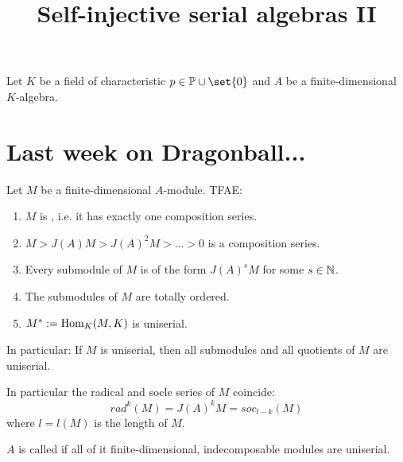 \documentclass[fontsize=11pt,fleqn,a4paper]{scrartcl}
\title{Self-injective serial algebras II}
\begin{document}
\maketitle

\begin{convention}
Let $K$ be a field of characteristic $p\in\IP\cup\set{0}$ and $A$ be a finite-dimensional $K$-algebra.
\end{convention}

\section{Last week on Dragonball...}

\begin{lemmadef}[Lemma 11.3.1]
Let $M$ be a finite-dimensional $A$-module. TFAE:
\begin{enumerate}
\item $M$ is , i.e. it has exactly one composition series.
\item $M > J(A)M > J(A)^2M > \ldots > 0$ is a composition series.
\item Every submodule of $M$ is of the form $J(A)^sM$ for some $s\in\mathbb{N}$.
\item The submodules of $M$ are totally ordered.
\item $M^\ast:=\operatorname{Hom}_K(M,K)$ is uniserial.
\end{enumerate}
In particular: If $M$ is uniserial, then all submodules and all quotients of $M$ are uniserial.
\end{lemmadef}

\begin{remark}
In particular the radical and socle series of $M$ coincide:
\[rad^k(M) = J(A)^kM = soc_{l-k}(M)\] 
where $l=l(M)$ is the length of $M$.
\end{remark}

\begin{definition}
$A$ is called  if all of it finite-dimensional, indecomposable modules are uniserial.
\end{definition}
\end{document}
